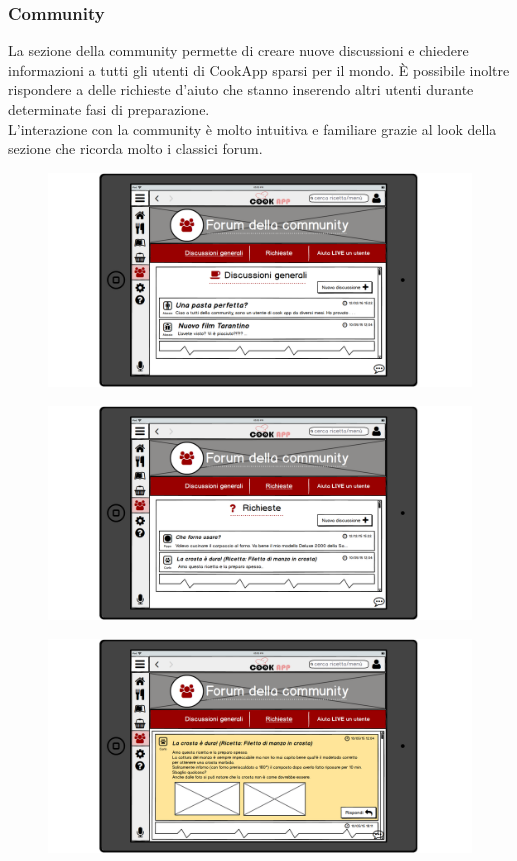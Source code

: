 \begin{itemize}
\subsubsection{Community}
La sezione della community permette di creare nuove discussioni e
chiedere informazioni a tutti gli utenti di CookApp sparsi per il mondo.
È possibile inoltre rispondere a delle richieste d'aiuto che stanno
inserendo altri utenti durante determinate fasi di preparazione.\\
L'interazione con la community è molto intuitiva e familiare grazie al look della
sezione che ricorda molto i classici forum.
\begin{figure}[H]
	\centering
	\includegraphics[width=0.95\linewidth]{img/mockup/Community.png}
\end{figure}
\begin{figure}[H]
	\centering
	\includegraphics[width=0.95\linewidth]{img/mockup/Community2.png}
\end{figure}
\begin{figure}[H]
	\centering
	\includegraphics[width=0.95\linewidth]{img/mockup/Community3.png}

\end{figure}
\end{itemize}
